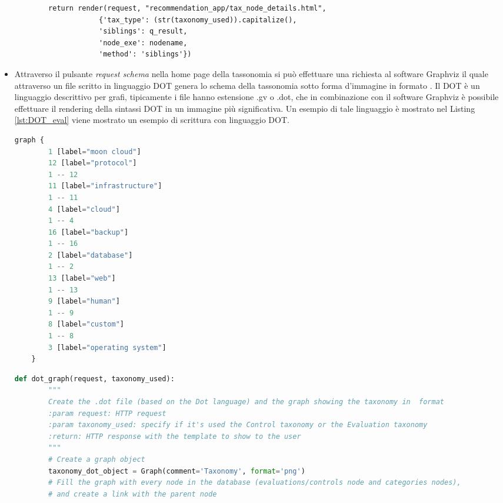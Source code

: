 \begin{itemize}
\begin{lstlisting}
        return render(request, "recommendation_app/tax_node_details.html",
                    {'tax_type': (str(taxonomy_used)).capitalize(),
                    'siblings': q_result,
                    'node_exe': nodename,
                    'method': 'siblings'})
    \end{lstlisting}
    \item Attraverso il pulsante \textit{request schema} nella home page della tassonomia si può effettuare una richiesta al software 
    Graphviz il quale attraverso un file scritto in linguaggio DOT genera lo schema della tassonomia sotto forma d'immagine in formato .\hfill\break
    Il DOT è un linguaggio descrittivo per grafi, tipicamente i file hanno estensione .gv o .dot, che in combinazione con il software Graphviz è possibile 
    effettuare il rendering della sintassi DOT in un immagine più significativa. Un esempio di tale linguaggio è mostrato nel Listing \ref{lst:DOT_eval} 
    viene mostrato un esempio di scrittura con linguaggio DOT.
    \lstset{style=python_code_style}
    \begin{lstlisting}[language=Python, label=lst:DOT_eval, caption={Codice parziale utilizzato per realizzare lo schema della tassonomia
        per le Evaluation.}]
    graph {
        1 [label="moon cloud"]
        12 [label="protocol"]
        1 -- 12
        11 [label="infrastructure"]
        1 -- 11
        4 [label="cloud"]
        1 -- 4
        16 [label="backup"]
        1 -- 16
        2 [label="database"]
        1 -- 2
        13 [label="web"]
        1 -- 13
        9 [label="human"]
        1 -- 9
        8 [label="custom"]
        1 -- 8
        3 [label="operating system"]
    }
    \end{lstlisting}
    \lstset{style=python_code_style}
    \begin{lstlisting}[language=Python, label=lst:view_DOT_eval, caption={Codice utilizzato per la realizzazione del
        file .dot e relativa immagine .}]
    def dot_graph(request, taxonomy_used):
        """
        Create the .dot file (based on the Dot language) and the graph showing the taxonomy in  format
        :param request: HTTP request
        :param taxonomy_used: specify if it's used the Control taxonomy or the Evaluation taxonomy
        :return: HTTP response with the template to show to the user
        """
        # Create a graph object
        taxonomy_dot_object = Graph(comment='Taxonomy', format='png')
        # Fill the graph with every node in the database (evaluations/controls node and categories nodes), 
        # and create a link with the parent node

\end{lstlisting}
\end{itemize}
